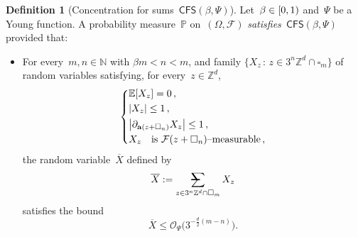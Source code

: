 \documentclass[11pt]{article} %
\makeatletter
\let\oldsquare\square %
\renewcommand{\square}{\oldsquare}
\numberwithin{equation}{section}
\theoremstyle{definition}
\newtheorem{definition}[theorem]{Definition}
\let\originalleft\left
\let\originalright\right
\renewcommand{\left}{\mathopen{}\mathclose\bgroup\originalleft}
\renewcommand{\right}{\aftergroup\egroup\originalright}
\newcommand*{\N}{\ensuremath{\mathbb{N}}}
\newcommand*{\Zd}{\ensuremath{\mathbb{Z}^d}}
\renewcommand{\a}{\mathbf{a}}
\newcommand{\cu}{\square}
\newcommand{\F}{\mathcal{F}}
\renewcommand{\P}{\mathbb{P}}
\newcommand{\E}{\mathbb{E}}
\renewcommand{\O}{\mathcal{O}}
\newcommand{\avsum}{\mathop{\mathpalette\avsuminner\relax}\displaylimits}
\newcommand\avsuminner[2]{%
  {\sbox0{$\m@th#1\sum$}%
   \vphantom{\usebox0}%
   \ooalign{%
     \hidewidth
     \smash{\,\rule[.23em]{8.8pt}{1.1pt} \relax}%
     \hidewidth\cr
     $\m@th#1\sum$\cr
   }%
  }%
}
\newcommand{\CFS}{\mathsf{CFS}}
\makeatother
\begin{document}
\begin{definition}[Concentration for sums~$\CFS(\beta,\Psi)$]
\label{d.CFS}
Let~$\beta \in \left[0,1\right)$ and~$\Psi$ be a Young function.
A probability measure~$\P$ on~$(\Omega,\F)$ \emph{satisfies~$\CFS(\beta,\Psi)$} provided that: 
\begin{itemize}
\item
For every~$m,n\in\N$ with $\beta m < n<m$, and  family $\{ X_z \,:\, z\in 3^n\Zd\cap \cu_m\}$ of random variables satisfying, for every~$z\in\Zd$,
\begin{equation} 
\label{e.CFS.ass}
\left\{
\begin{aligned}
& \E\left[ X_z \right]=0 \,, 
\\ & 
\left| X_z \right| \leq 1\,,
\\ &   
\left| \partial_{\a(z+\cu_n)} X_z\right| \leq 1 \,,
\\
& X_z \quad \mbox{is $\F(z+\cu_n)$--measurable} \,, \\
\end{aligned}
\right.
\end{equation}
the random variable~$\overline{X}$ defined by
\begin{equation} 
\label{e.Z.norm}
\overline{X}  :=  \avsum_{z\in 3^n\Zd\cap \cu_m}  X_z
\end{equation}
satisfies the bound
\begin{equation}
\label{e.CFS}
\overline{X}
\leq
\O_{\Psi}
\bigl( 3^{-\frac d2(m-n)} \bigr).
\end{equation}
\end{itemize}
\end{definition}
\end{document}
